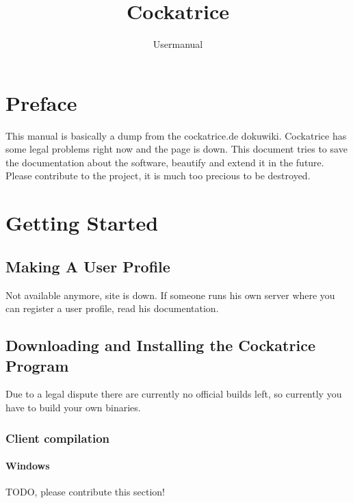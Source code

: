 \documentclass[a4paper]{scrbook}
\title{Cockatrice}
\subtitle{Usermanual}
\begin{document}
\maketitle
\tableofcontents

\chapter{Preface}
This manual is basically a dump from the cockatrice.de dokuwiki. Cockatrice has some legal problems right now and the page is down.
This document tries to save the documentation about the software, beautify and extend it in the future.
Please contribute to the project, it is much too precious to be destroyed.

\chapter{Getting Started}
\section{Making A User Profile}
Not available anymore, site is down. 
If someone runs his own server where you can register a user profile, read his documentation.

\section{Downloading and Installing the Cockatrice Program}
Due to a legal dispute there are currently no official builds left, so currently you have to build your own binaries.

\subsection{Client compilation}
\subsubsection{Windows}
TODO, please contribute this section!
\end{document}

